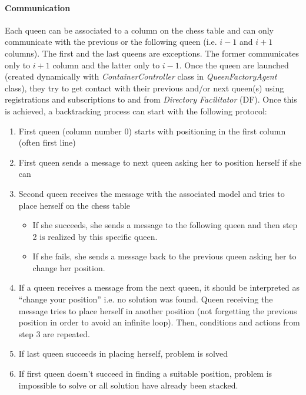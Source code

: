 \documentclass[a4paper,11pt]{article}
\begin{document}
  \paragraph{Communication}  
  Each queen can be associated to a column on the chess table and can only communicate with the previous or the following queen (i.e. $i-1$ and $i+1$ columns). 
  The first and the last queens are exceptions. The former communicates only to $i+1$ column and the latter only to $i-1$. Once the 
  queen are launched (created dynamically with \textit{ContainerController} class in \textit{QueenFactoryAgent} class), they try to get contact with their previous 
  and/or next queen(s) using registrations and subscriptions to and from \textit{Directory Facilitator} (DF). Once this is achieved, a backtracking process 
  can start with the following protocol:
  \begin{enumerate}
   \item First queen (column number 0) starts with positioning in the first column (often first line)
   \item First queen sends a message to next queen asking her to position herself if she can
   \item Second queen receives the message with the associated model and tries to place herself on the chess table
   \begin{itemize}
    \item If she succeeds, she sends a message to the following queen and then step 2 is realized by this specific queen.
    \item If she fails, she sends a message back to the previous queen asking her to change her position.
   \end{itemize}
   \item If a queen receives a message from the next queen, it should be interpreted as ``change your position'' i.e. no solution was found.
   Queen receiving the message tries to place herself in another position (not forgetting the previous position in order 
   to avoid an infinite loop). Then, conditions and actions from step 3 are repeated.
   \item If last queen succeeds in placing herself, problem is solved
   \item If first queen doesn't succeed in finding a suitable position, problem is impossible to solve or all solution have already
   been stacked.
  \end{enumerate}
  
\end{document}
